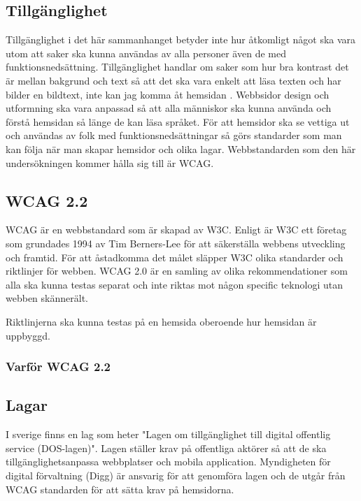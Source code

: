 \documentclass[11p]{article}
\begin{document}
    \subsection{Tillgänglighet}
    Tillgänglighet i det här sammanhanget betyder inte hur åtkomligt något ska vara utom att saker ska kunna användas av alla personer även de med funktionsnedsättning.
    Tillgänglighet handlar om saker som hur bra kontrast det är mellan bakgrund och text så att det ska vara enkelt att läsa texten och har bilder en bildtext, inte kan jag komma åt hemsidan \parencite{webbriktlinjer}.
    Webbsidor design och utformning ska vara anpassad så att alla människor ska kunna använda och förstå hemsidan så länge de kan läsa språket.
    För att hemsidor ska se vettiga ut och användas av folk med funktionsnedsättningar så görs standarder som man kan följa när man skapar hemsidor och olika lagar.
    Webbstandarden som den här undersökningen kommer hålla sig till är WCAG.

    \subsection{WCAG 2.2}
    WCAG är en webbstandard som är skapad av W3C.
    Enligt \textcite{W3C} är W3C ett företag som grundades 1994 av Tim Berners-Lee för att säkerställa webbens utveckling och framtid.
    För att åstadkomma det målet släpper W3C olika standarder och riktlinjer för webben.
    WCAG 2.0 är en samling av olika rekommendationer som alla ska kunna testas separat och inte riktas mot någon specific teknologi utan webben skännerält. \parencite{WCAG_2.0}



    Riktlinjerna ska kunna testas på en hemsida oberoende hur hemsidan är uppbyggd.

    \subsubsection{Varför WCAG 2.2}

    \subsection{Lagar}
    I sverige finns en lag som heter "Lagen om tillgänglighet till digital offentlig service (DOS-lagen)".\parencite{Dos-lagen}
    Lagen ställer krav på offentliga aktörer så att de ska tillgänglighetsanpassa webbplatser och mobila application.
    Myndigheten för digital förvaltning (Digg) är ansvarig för att genomföra lagen och de utgår från WCAG standarden för att sätta krav på hemsidorna.
\end{document}
